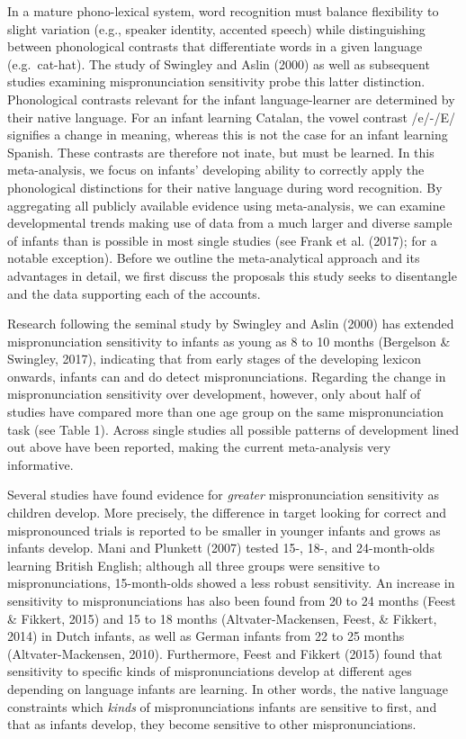 \documentclass[man]{apa6}
\theoremstyle{definition}
\theoremstyle{definition}
\theoremstyle{definition}
\theoremstyle{remark}
\begin{document}
In a mature phono-lexical system, word recognition must balance
flexibility to slight variation (e.g., speaker identity, accented
speech) while distinguishing between phonological contrasts that
differentiate words in a given language (e.g.~cat-hat). The study of
Swingley and Aslin (2000) as well as subsequent studies examining
mispronunciation sensitivity probe this latter distinction. Phonological
contrasts relevant for the infant language-learner are determined by
their native language. For an infant learning Catalan, the vowel
contrast /e/-/E/ signifies a change in meaning, whereas this is not the
case for an infant learning Spanish. These contrasts are therefore not
inate, but must be learned. In this meta-analysis, we focus on infants'
developing ability to correctly apply the phonological distinctions for
their native language during word recognition. By aggregating all
publicly available evidence using meta-analysis, we can examine
developmental trends making use of data from a much larger and diverse
sample of infants than is possible in most single studies (see Frank et
al. (2017); for a notable exception). Before we outline the
meta-analytical approach and its advantages in detail, we first discuss
the proposals this study seeks to disentangle and the data supporting
each of the accounts.

Research following the seminal study by Swingley and Aslin (2000) has
extended mispronunciation sensitivity to infants as young as 8 to 10
months (Bergelson \& Swingley, 2017), indicating that from early stages
of the developing lexicon onwards, infants can and do detect
mispronunciations. Regarding the change in mispronunciation sensitivity
over development, however, only about half of studies have compared more
than one age group on the same mispronunciation task (see Table 1).
Across single studies all possible patterns of development lined out
above have been reported, making the current meta-analysis very
informative.

Several studies have found evidence for \emph{greater} mispronunciation
sensitivity as children develop. More precisely, the difference in
target looking for correct and mispronounced trials is reported to be
smaller in younger infants and grows as infants develop. Mani and
Plunkett (2007) tested 15-, 18-, and 24-month-olds learning British
English; although all three groups were sensitive to mispronunciations,
15-month-olds showed a less robust sensitivity. An increase in
sensitivity to mispronunciations has also been found from 20 to 24
months (Feest \& Fikkert, 2015) and 15 to 18 months (Altvater-Mackensen,
Feest, \& Fikkert, 2014) in Dutch infants, as well as German infants
from 22 to 25 months (Altvater-Mackensen, 2010). Furthermore, Feest and
Fikkert (2015) found that sensitivity to specific kinds of
mispronunciations develop at different ages depending on language
infants are learning. In other words, the native language constraints
which \emph{kinds} of mispronunciations infants are sensitive to first,
and that as infants develop, they become sensitive to other
mispronunciations.
\end{document}
